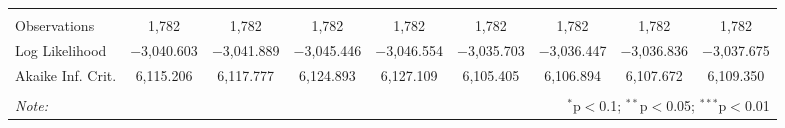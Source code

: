 \begin{table}[!htbp]
\begin{tabular}{@{\extracolsep{5pt}}lcccccccc}
\hline \\[-1.8ex] 
Observations & 1,782 & 1,782 & 1,782 & 1,782 & 1,782 & 1,782 & 1,782 & 1,782 \\ 
Log Likelihood & $-$3,040.603 & $-$3,041.889 & $-$3,045.446 & $-$3,046.554 & $-$3,035.703 & $-$3,036.447 & $-$3,036.836 & $-$3,037.675 \\ 
Akaike Inf. Crit. & 6,115.206 & 6,117.777 & 6,124.893 & 6,127.109 & 6,105.405 & 6,106.894 & 6,107.672 & 6,109.350 \\ 
\hline 
\hline \\[-1.8ex] 
\textit{Note:}  & \multicolumn{8}{r}{$^{*}$p$<$0.1; $^{**}$p$<$0.05; $^{***}$p$<$0.01} \\ 
\end{tabular} 
\end{table} 
